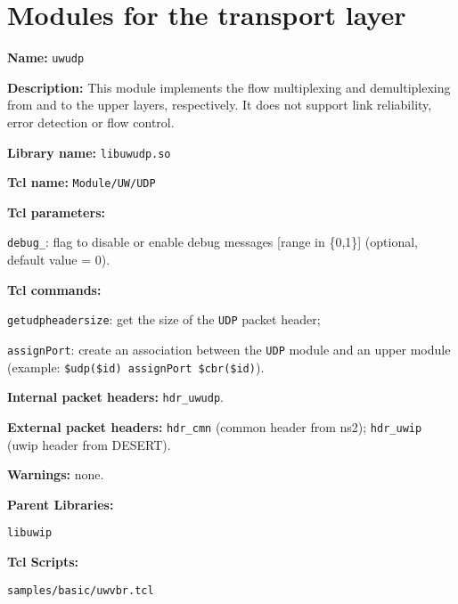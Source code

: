 \section{Modules for the transport layer}\label{sec:transport}

\begin{description}
   \item {\bf Name:} {\tt uwudp}
   \item {\bf Description:} This module implements the flow multiplexing and demultiplexing from and to the upper layers, respectively.  It does not support link reliability, error detection or flow control.
   \item {\bf Library name:} {\tt libuwudp.so}
   \item {\bf Tcl name:} {\tt Module/UW/UDP}
   \item {\bf Tcl parameters:}
    \begin{description}
     \item {\tt debug\_}: flag to disable or enable debug messages [range in \{0,1\}] (optional, default value = 0).
    \end{description}
   \item {\bf Tcl commands:}
    \begin{description}
   	 \item {\tt getudpheadersize}: get the size of the {\tt UDP} packet header;
   	 \item {\tt assignPort}: create an association between the {\tt UDP} module and an upper module (example: {\tt \$udp(\$id) assignPort \$cbr(\$id)}).
 	\end{description}
   \item {\bf Internal packet headers:} {\tt hdr\_uwudp}.
   \item {\bf External packet headers:} {\tt hdr\_cmn} (common header from ns2); {\tt hdr\_uwip} (uwip header from DESERT).
   \item {\bf Warnings:} none.
   \item {\bf Parent Libraries:}
   \begin{description}
   \item {\tt libuwip}
   \end{description}
   \item {\bf Tcl Scripts:} 
   \begin{description}
   \item {\tt samples/basic/uwvbr.tcl}
   \end{description}
\end{description}

